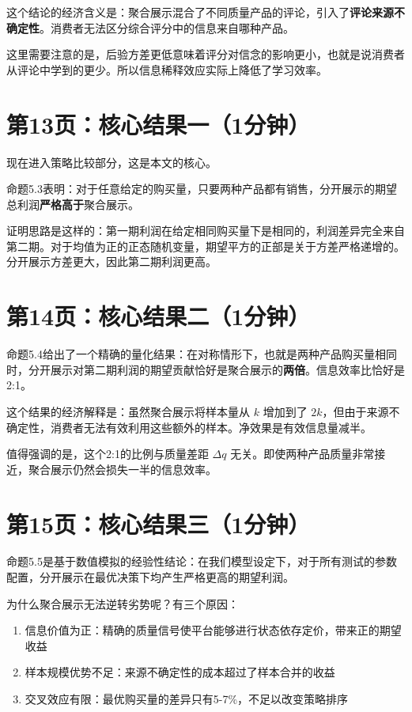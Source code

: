 \documentclass[12pt,a4paper]{article}
\begin{document}
这个结论的经济含义是：聚合展示混合了不同质量产品的评论，引入了\textbf{评论来源不确定性}。消费者无法区分综合评分中的信息来自哪种产品。

这里需要注意的是，后验方差更低意味着评分对信念的影响更小，也就是说消费者从评论中学到的更少。所以信息稀释效应实际上降低了学习效率。

\section*{第13页：核心结果一（1分钟）}

现在进入策略比较部分，这是本文的核心。

命题5.3表明：对于任意给定的购买量，只要两种产品都有销售，分开展示的期望总利润\textbf{严格高于}聚合展示。

证明思路是这样的：第一期利润在给定相同购买量下是相同的，利润差异完全来自第二期。对于均值为正的正态随机变量，期望平方的正部是关于方差严格递增的。分开展示方差更大，因此第二期利润更高。

\section*{第14页：核心结果二（1分钟）}

命题5.4给出了一个精确的量化结果：在对称情形下，也就是两种产品购买量相同时，分开展示对第二期利润的期望贡献恰好是聚合展示的\textbf{两倍}。信息效率比恰好是2:1。

这个结果的经济解释是：虽然聚合展示将样本量从 $k$ 增加到了 $2k$，但由于来源不确定性，消费者无法有效利用这些额外的样本。净效果是有效信息量减半。

值得强调的是，这个2:1的比例与质量差距 $\Delta q$ 无关。即使两种产品质量非常接近，聚合展示仍然会损失一半的信息效率。

\section*{第15页：核心结果三（1分钟）}

命题5.5是基于数值模拟的经验性结论：在我们模型设定下，对于所有测试的参数配置，分开展示在最优决策下均产生严格更高的期望利润。

为什么聚合展示无法逆转劣势呢？有三个原因：
\begin{enumerate}[itemsep=0pt]
    \item 信息价值为正：精确的质量信号使平台能够进行状态依存定价，带来正的期望收益
    \item 样本规模优势不足：来源不确定性的成本超过了样本合并的收益
    \item 交叉效应有限：最优购买量的差异只有5-7\%，不足以改变策略排序
\end{enumerate}
\end{document}
